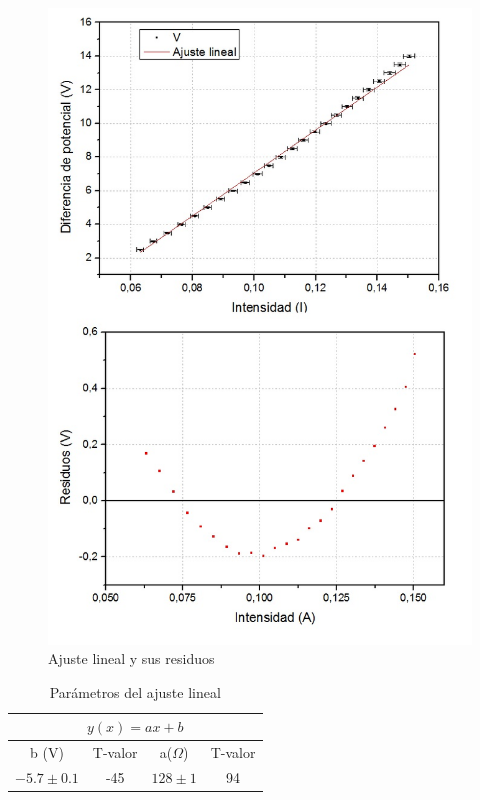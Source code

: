 \documentclass[twoside,twocolumn,a4paper]{article}
\begin{document}
\begin{figure}[h]
\includegraphics[width=\linewidth]{fig_line.jpg}
\caption{Ajuste lineal y sus residuos}
\label{fig:line}
\end{figure}

\begin{table}[h]
\centering
\caption{Par\'ametros del ajuste lineal}
\label{tab:line}
\begin{tabular}{|c|c|c|c|}
\hline
\multicolumn{4}{|c|}{$y(x)=ax+b$}           \\ \hline
b (V)        & T-valor & a($\Omega$) & T-valor \\ \hline
$-5.7\pm0.1$ & -45     & $128\pm1$   & 94      \\ \hline
\end{tabular}
\end{table}
\end{document}
